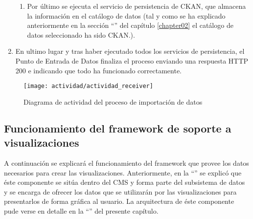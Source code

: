 \begin{enumerate}
\begin{enumerate}
			\item Por último se ejecuta el servicio de persistencia de CKAN, que almacena la información en el catálogo de datos (tal y como se ha explicado anteriormente en la sección ``'' del capítulo \ref{chapter02} el catálogo de datos seleccionado ha sido CKAN.).
		\end{enumerate}
	\item En ultimo lugar y tras haber ejecutado todos los servicios de persistencia, el Punto de Entrada de Datos finaliza el proceso enviando una respuesta HTTP 200 e indicando que todo ha funcionado correctamente.
\end{enumerate}
\begin{figure}[h]
	\centering
	\texttt{[image: actividad/actividad\_receiver]}
	\caption{Diagrama de actividad del proceso de importación de datos}
	\label{fig:diagrama_actividad_receiver}
\end{figure}



\subsection{Funcionamiento del framework de soporte a visualizaciones}
\label{actividad:framework_visualizaciones}
A continuación se explicará el funcionamiento del framework que provee los datos necesarios para crear las visualizaciones.  Anteriormente, en la ``'' se explicó que éste componente se sitúa dentro del CMS y forma parte del subsistema de datos y se encarga de ofrecer los datos que se utilizarán por las visualizaciones para presentarlos de forma gráfica al usuario.  La arquitectura de éste componente pude verse en detalle en la  ``'' del presente capítulo.

